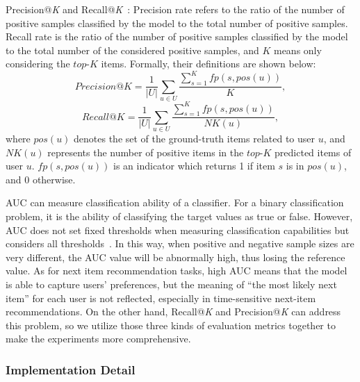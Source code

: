 \documentclass[preprint,12pt]{elsarticle}
\begin{document}
\begin{sloppypar}
Precision@\emph{K} and Recall@\emph{K}~\cite{huang2018csan}: Precision rate refers to the ratio of the number of positive samples classified by the model to the total number of positive samples. Recall rate is the ratio of the number of positive samples classified by the model to the total number of the considered positive samples, and $K$ means only considering the $top$-$K$ items. Formally, their definitions are shown below:
\begin{equation}
Precision@K = \frac{1}{|U|} \sum_{u\in U} \frac{\sum_{s=1}^{K} fp(s, pos(u))}{K},
\end{equation}
\begin{equation}
Recall@K = \frac{1}{|U|} \sum_{u\in U} \frac{\sum_{s=1}^{K} fp(s, pos(u))}{NK(u)},
\end{equation}
where $pos(u)$ denotes the set of the ground-truth items related to user $u$, and $NK(u)$ represents the number of positive items in the $top$-$K$ predicted items of user $u$. $fp(s, pos(u))$ is an indicator which returns 1 if item $s$ is in $pos(u)$, and 0 otherwise.

AUC can measure classification ability of a classifier. For a binary classification problem, it is the ability of classifying the target values as true or false. However, AUC does not set fixed thresholds when measuring classification capabilities but considers all thresholds~\cite{dodd2003partial}. In this way, when positive and negative sample sizes are very different, the AUC value will be abnormally high, thus losing the reference value. As for next item recommendation tasks, high AUC means that the model is able to capture users' preferences, but the meaning of ``the most likely next item'' for each user is not reflected, especially in time-sensitive next-item recommendations. On the other hand, Recall@\emph{K} and Precision@\emph{K} can address this problem, so we utilize those three kinds of evaluation metrics together to make the experiments more comprehensive.

\subsubsection{Implementation Detail}


\end{sloppypar}
\end{document}
